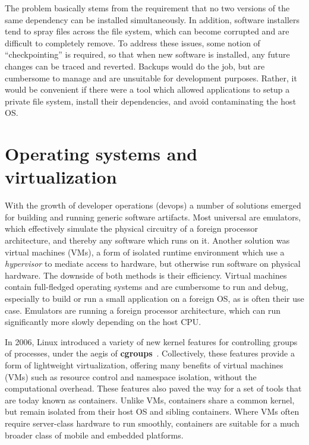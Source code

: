 \documentclass[12pt,initial,twoside,maitrise]{dms}
\numberwithin{equation}{section}
\numberwithin{table}{chapter}
\numberwithin{figure}{chapter}
\begin{document}
The problem basically stems from the requirement that no two versions of the same dependency can be installed simultaneously. In addition, software installers tend to spray files across the file system, which can become corrupted and are difficult to completely remove. To address these issues, some notion of ``checkpointing'' is required, so that when new software is installed, any future changes can be traced and reverted. Backups would do the job, but are cumbersome to manage and are unsuitable for development purposes. Rather, it would be convenient if there were a tool which allowed applications to setup a private file system, install their dependencies, and avoid contaminating the host OS.

\section{Operating systems and virtualization}\label{sec:os-and-virtualization}

With the growth of developer operations (devops) a number of solutions emerged for building and running generic software artifacts. Most universal are emulators, which effectively simulate the physical circuitry of a foreign processor architecture, and thereby any software which runs on it. Another solution was virtual machines (VMs), a form of isolated runtime environment which use a \textit{hypervisor} to mediate access to hardware, but otherwise run software on physical hardware. The downside of both methods is their efficiency. Virtual machines contain full-fledged operating systems and are cumbersome to run and debug, especially to build or run a small application on a foreign OS, as is often their use case. Emulators are running a foreign processor architecture, which can run significantly more slowly depending on the host CPU.

In 2006, Linux introduced a variety of new kernel features for controlling groups of processes, under the aegis of \textbf{cgroups}~\cite{menage2007adding}. Collectively, these features provide a form of lightweight virtualization, offering many benefits of virtual machines (VMs) such as resource control and namespace isolation, without the computational overhead. These features also paved the way for a set of tools that are today known as containers. Unlike VMs, containers share a common kernel, but remain isolated from their host OS and sibling containers. Where VMs often require server-class hardware to run smoothly, containers are suitable for a much broader class of mobile and embedded platforms.
\end{document}
